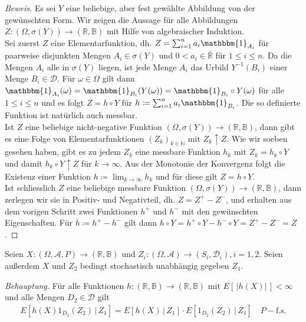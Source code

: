 \documentclass[10pt]{article}
\newcommand{\R}{\mathbb{R}}
\newcommand{\A}{\mathcal{A}}
\newcommand{\D}{\mathcal{D}}
\newcommand{\B}{\mathbb{B}}
\newcommand{\gap}{\,\vert\,}
\newcommand{\beh}{\textit{Behauptung. }}
\newenvironment{Aufgabe}[2][Aufgabe]{\begin{trivlist}
\item[\hskip \labelsep {\bfseries #1}\hskip \labelsep {\bfseries #2.}]}{\end{trivlist}}
\begin{document}
\begin{proof}[Beweis]
	Es sei $Y$ eine beliebige, aber fest gewählte Abbildung von der gewünschten Form. Wir zeigen die Aussage für alle Abbildungen $Z:(\Omega, \sigma(Y)) \rightarrow (\mathbb{R}, \mathbb{B})$ mit Hilfe von algebraischer Induktion. \\

	Sei zuerst $Z$ eine Elementarfunktion, dh. $Z = \sum_{i=1}^n a_i \mathbbm{1}_{A_i}$ für paarweise disjunkten Mengen $A_i \in \sigma(Y)$ und $0 < a_i \in \bar{\mathbb{R}}$ für $1 \leq i \leq n$. 
	Da die Mengen $A_i$ alle in $\sigma(Y)$ liegen, ist jede Menge $A_i$ das Urbild $Y^{-1}(B_i)$ einer Menge $B_i \in \mathcal{D}$. Für $\omega \in \Omega$ gilt dann $\mathbbm{1}_{A_i}(\omega) = \mathbbm{1}_{B_i}(Y(\omega)) = \mathbbm{1}_{B_i} \circ Y (\omega)$
	für alle $1 \leq i \leq n$ und es folgt $Z = h \circ Y$ für $h \coloneqq \sum_{i=1}^n a_i \mathbbm{1}_{B_i}$. Die so definierte Funktion ist natürlich auch messbar. \\

	Ist $Z$ eine beliebige nicht-negative Funktion $(\Omega, \sigma(Y)) \rightarrow (\mathbb{R}, \mathbb{B})$, dann gibt es eine Folge von Elementarfunktionen $(Z_k)_{k \in \mathbb{N}}$  mit $Z_k \uparrow Z$. Wie wir soeben gesehen haben, gibt es zu jedem $Z_k$ eine 	messbare Funktion $h_k$ mit $Z_k = h_k \circ Y$ und damit $h_k \circ Y \uparrow Z$ für $k \to \infty$. Aus der Monotonie der Konvergenz folgt die Existenz einer Funktion $h \coloneqq \lim_{k \to \infty} h_k$ und für diese gilt $Z = h \circ Y$. \\

	Ist schliesslich $Z$ eine beliebige messbare Funktion $(\Omega, \sigma(Y)) \rightarrow (\mathbb{R}, \mathbb{B})$, dann zerlegen wir sie in Positiv- und Negativteil, dh. $Z = Z^+ - Z^-$, und erhalten aus dem vorigen Schritt zwei Funktionen $h^+$ und $h^-$ mit den
	gewünschten Eigenschaften. Für $h \coloneqq h^+ - h^-$ gilt dann $h \circ Y = h^+\circ Y - h^-\circ Y = Z^+ - Z^- = Z$.  
\end{proof}

\begin{Aufgabe}{3} %
	Seien $X : (\Omega, \A, P)\to (\R, \B)$ und $Z_i : (\Omega, \A)\to (S_i, \D_i), i = 1,2$. Seien außerdem $X$ und $Z_2$
	bedingt stochastisch unabhängig gegeben $Z_1$.
\end{Aufgabe}

\beh Für alle Funktionen $h: (\R,\B)\to (\R,\B)$ mit $E[\,\vert h(X) \vert\,] < \infty$ und alle Mengen $D_2\in\D$ gilt 
	\begin{align*}
		E[h(X)1_{D_2}(Z_2) \,\vert\, Z_1] = E[h(X) \,\vert\, Z_1] \cdot E[1_{D_2}(Z_2) \gap Z_1] \quad\text{$P-$f.s.}
	\end{align*}
\end{document}
